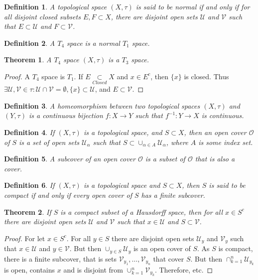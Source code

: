 \documentclass[12pt,oneside]{book}
\theoremstyle{mystyle}
\newtheorem{theorem}{Theorem}[section]
\newtheorem{definition}{Definition}[section]
\begin{document}
\begin{definition}
A topological space $(X,\tau)$ is said to be normal if and only if for all disjoint closed subsets $E,F\subset X$, there are disjoint open sets $\mathcal{U}$ and $\mathcal{V}$ such that $E\subset \mathcal{U}$ and $F\subset \mathcal{V}$.
\end{definition}

\begin{definition}
A $T_4$ space is a normal $T_1$ space.
\end{definition}

\begin{theorem}
A $T_4$ space $(X,\tau)$ is a $T_3$ space.
\end{theorem}
\begin{proof}
A $T_4$ space is $T_1$. If $E\underset{Closed}\subset X$ and $x\in E^c$, then $\{x\}$ is closed. Thus $\exists \mathcal{U},\mathcal{V}\in\tau: \mathcal{U}\cap\mathcal{V}=\emptyset, \{x\}\subset \mathcal{U}$, and $E\subset \mathcal{V}$.
\end{proof}

\begin{definition}
A homeomorphism between two topological spaces $(X,\tau)$ and $(Y,\tau)$ is a continuous bijection $f:X\rightarrow Y$ such that $f^{-1}:Y\rightarrow X$ is continuous.
\end{definition}

\begin{definition}
If $(X,\tau)$ is a topological space, and $S\subset X$, then an open cover $\mathcal{O}$ of $S$ is a set of open sets $\mathcal{U}_{\alpha}$ such that $S\subset \cup_{\alpha\in A} \mathcal{U}_{\alpha}$, where $A$ is some index set.
\end{definition}

\begin{definition}
A subcover of an open cover $\mathcal{O}$ is a subset of $\mathcal{O}$ that is also a cover.
\end{definition}

\begin{definition}
If $(X,\tau)$ is a topological space and $S\subset X$, then $S$ is said to be compact if and only if every open cover of $S$ has a finite subcover.
\end{definition}

\begin{theorem}
If $S$ is a compact subset of a Hausdorff space, then for all $x\in S^c$ there are disjoint open sets $\mathcal{U}$ and $\mathcal{V}$ such that $x\in \mathcal{U}$ and $S\subset \mathcal{V}$.
\end{theorem}
\begin{proof}
For let $x\in S^c$. For all $y\in S$ there are disjoint open sets $\mathcal{U}_y$ and $\mathcal{V}_y$ such that $x\in \mathcal{U}$ and $y\in \mathcal{V}$. But then $\cup_{y\in S} \mathcal{U}_y$ is an open cover of $S$. As $S$ is compact, there is a finite subcover, that is sets $\mathcal{V}_{y_1},\hdots, \mathcal{V}_{y_n}$ that cover $S$. But then $\cap_{k=1}^{n} \mathcal{U}_{y_k}$ is open, contains $x$ and is disjoint from $\cup_{k=1}^{n} \mathcal{V}_{y_k}$. Therefore, etc.
\end{proof}
\end{document}
